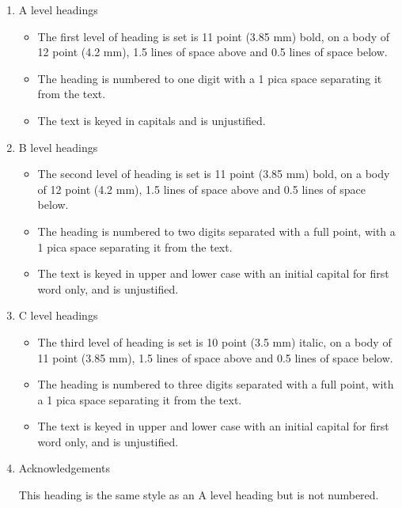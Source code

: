 \documentclass{ecai}  %
\begin{document}
\begin{enumerate}
\item{A level headings}

\begin{itemize}
\item The first level of heading is set is 11 point (3.85 mm) bold, on
  a body of 12 point (4.2 mm), 1.5 lines of space above and 0.5 lines
  of space below.

\item The heading is numbered to one digit with a 1 pica space
  separating it from the text.

\item The text is keyed in capitals and is unjustified.
\end{itemize}

\item{B level headings}
\begin{itemize}
\item The second level of heading is set is 11 point (3.85 mm) bold,
  on a body of 12 point (4.2 mm), 1.5 lines of space above and 0.5
  lines of space below.

\item The heading is numbered to two digits separated with a full
  point, with a 1 pica space separating it from the text.

\item The text is keyed in upper and lower case with an initial
  capital for first word only, and is unjustified.
\end{itemize}

\item{C level headings}
\begin{itemize}
\item The third level of heading is set is 10 point (3.5 mm) italic,
  on a body of 11 point (3.85 mm), 1.5 lines of space above and 0.5
  lines of space below.

\item The heading is numbered to three digits separated with a full
  point, with a 1 pica space separating it from the text.

\item The text is keyed in upper and lower case with an initial
  capital for first word only, and is unjustified.
\end{itemize}

\item{Acknowledgements}

  This heading is the same style as an A level heading but is not
  numbered.
\end{enumerate}
\end{document}
